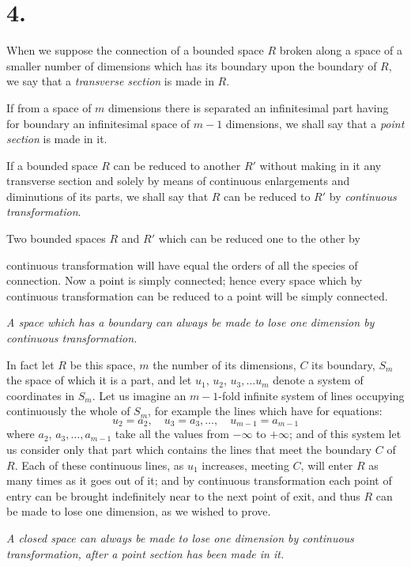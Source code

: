 \documentclass{article}
\begin{document}
\section*{4.}

When we suppose the connection of a bounded space $R$ broken along a space of a smaller number of dimensions which has its boundary upon the boundary of $R$, we say that a \emph{transverse section} is made in $R$.

If from a space of $m$ dimensions there is separated an infinitesimal part having for boundary an infinitesimal space of $m-1$ dimensions, we shall say that a \emph{point section} is made in it.

If a bounded space $R$ can be reduced to another $R'$ without making in it any transverse section and solely by means of continuous enlargements and diminutions of its parts, we shall say that $R$ can be reduced to $R'$ by \emph{continuous transformation}.

Two bounded spaces $R$ and $R'$ which can be reduced one to the other by

continuous transformation will have equal the orders of all the species of connection. Now a point is simply connected; hence every space which by continuous transformation can be reduced to a point will be simply connected.

\emph{A space which has a boundary can always be made to lose one dimension by continuous transformation.}

In fact let $R$ be this space, $m$ the number of its dimensions, $C$ its boundary, $S_{m}$ the space of which it is a part, and let $u_{1}$, $u_{2}$, $u_{3},\ldots u_{m}$ denote a system of coordinates in $S_{m}$. Let us imagine an $m-1$-fold infinite system of lines occupying continuously the whole of $S_{m}$, for example the lines which have for equations:
\[ u_{2} = a_{2}, \quad u_{3} = a_{3},\ldots, \quad u_{m-1} = a_{m-1} \]
where $a_{2}$, $a_{3},\ldots, a_{m-1}$ take all the values from $-\infty$ to $+\infty$; and of this system let us consider only that part which contains the lines that meet the boundary $C$ of $R$. Each of these continuous lines, as $u_{1}$ increases, meeting $C$, will enter $R$ as many times as it goes out of it; and by continuous transformation each point of entry can be brought indefinitely near to the next point of exit, and thus $R$ can be made to lose one dimension, as we wished to prove.

\emph{A closed space can always be made to lose one dimension by continuous transformation, after a point section has been made in it.}
\end{document}

